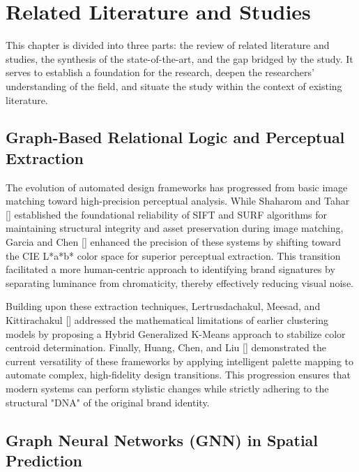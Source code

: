 
\chapter{Related Literature and Studies}
\begin{refsection}

This chapter is divided into three parts: the review of related literature and studies, the synthesis of the state-of-the-art, and the gap bridged by the study. It serves to establish a foundation for the research, deepen the researchers' understanding of the field, and situate the study within the context of existing literature.  


\section{Graph-Based Relational Logic and Perceptual Extraction}

The evolution of automated design frameworks has progressed from basic image matching toward high-precision perceptual analysis. While Shaharom and Tahar [\citeyear{Shaharom2023SIFT}] established the foundational reliability of SIFT and SURF algorithms for maintaining structural integrity and asset preservation during image matching, Garcia and Chen [\citeyear{Garcia2023}] enhanced the precision of these systems by shifting toward the CIE L*a*b* color space for superior perceptual extraction. This transition facilitated a more human-centric approach to identifying brand signatures by separating luminance from chromaticity, thereby effectively reducing visual noise.

Building upon these extraction techniques, Lertrusdachakul, Meesad, and Kittirachakul [\citeyear{Lertrusdachakul2025Hybrid}] addressed the mathematical limitations of earlier clustering models by proposing a Hybrid Generalized K-Means approach to stabilize color centroid determination. Finally, Huang, Chen, and Liu [\citeyear{Huang2025Recoloring}] demonstrated the current versatility of these frameworks by applying intelligent palette mapping to automate complex, high-fidelity design transitions. This progression ensures that modern systems can perform stylistic changes while strictly adhering to the structural "DNA" of the original brand identity.


\section{Graph Neural Networks (GNN) in Spatial Prediction}


\end{refsection}
